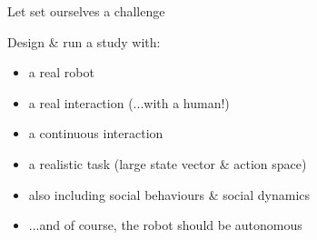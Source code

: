 \documentclass[xcolor=table]{beamer}
\begin{document}
\begin{frame}{Let set ourselves a challenge}

    Design \& run a study with:
    
    \begin{itemize}
        \item<+-> a real robot
        \item<+-> a real interaction (...with a human!)
        \item<+-> a continuous interaction
        \item<+-> a realistic task (large state vector \& action space)
        \item<+-> also including social behaviours \& social dynamics
        \item<+-> ...and of course, the robot should be autonomous
    \end{itemize}

\end{frame}
\end{document}
